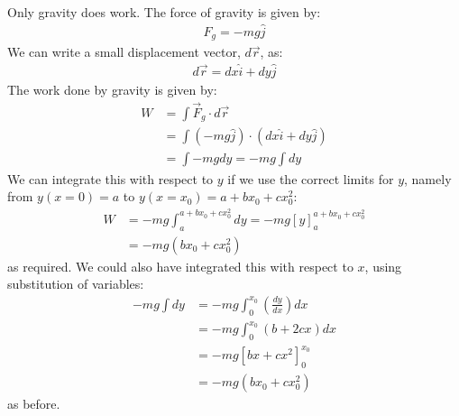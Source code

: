 \begin{solution}
Only gravity does work. The force of gravity is given by:
\begin{align*}
F_g = -mg\hat j
\end{align*}
We can write a small displacement vector, $d\vec r$, as:
\begin{align*}
d\vec r=dx\hat i+dy\hat j
\end{align*}
The work done by gravity is given by:
\begin{align*}
W&=\int \vec F_g \cdot d\vec r \\
&=\int (-mg\hat j) \cdot (dx\hat i+dy\hat j) \\
&=\int -mg dy=-mg\int dy
\end{align*}
We can integrate this with respect to $y$ if we use the correct limits for $y$, namely from $y(x=0)=a$ to $y(x=x_0)=a+bx_0+cx_0^2$:
\begin{align*}
W&=-mg\int_{a}^{a+bx_0+cx_0^2} dy=-mg \left[y\right]_{a}^{a+bx_0+cx_0^2}\\
&=-mg(bx_0+cx_0^2)
\end{align*}
as required. We could also have integrated this with respect to $x$, using substitution of variables:
\begin{align*}
-mg\int dy &=-mg\int_0^{x_0} \left(\frac{dy}{dx}\right)dx\\
&=-mg\int_0^{x_0} \left( b+2cx \right)dx\\
&=-mg \left[bx+cx^2  \right]_0^{x_0}\\
&=-mg(bx_0+cx_0^2)
\end{align*}
as before.
\end{solution}

